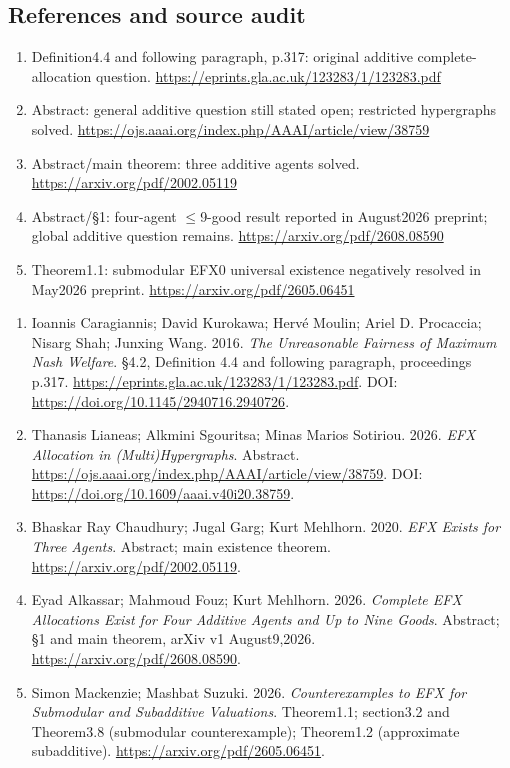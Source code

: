 \documentclass[11pt,a4paper]{article}
\begin{document}
\subsection*{References and source audit}
\begin{enumerate}
\item Definition4.4 and following paragraph, p.317: original additive complete-allocation question. \url{https://eprints.gla.ac.uk/123283/1/123283.pdf}
\item Abstract: general additive question still stated open; restricted hypergraphs solved. \url{https://ojs.aaai.org/index.php/AAAI/article/view/38759}
\item Abstract/main theorem: three additive agents solved. \url{https://arxiv.org/pdf/2002.05119}
\item Abstract/§1: four-agent \ensuremath{\leq}9-good result reported in August2026 preprint; global additive question remains. \url{https://arxiv.org/pdf/2608.08590}
\item Theorem1.1: submodular EFX0 universal existence negatively resolved in May2026 preprint. \url{https://arxiv.org/pdf/2605.06451}
\end{enumerate}
\begin{enumerate}\raggedright
\item\hypertarget{definitions:source:30007558:1}{} Ioannis Caragiannis; David Kurokawa; Hervé Moulin; Ariel D. Procaccia; Nisarg Shah; Junxing Wang. 2016. \emph{The Unreasonable Fairness of Maximum Nash Welfare}. §4.2, Definition 4.4 and following paragraph, proceedings p.317.
\url{https://eprints.gla.ac.uk/123283/1/123283.pdf}.
DOI: \url{https://doi.org/10.1145/2940716.2940726}.
\item\hypertarget{definitions:source:30007558:2}{} Thanasis Lianeas; Alkmini Sgouritsa; Minas Marios Sotiriou. 2026. \emph{EFX Allocation in (Multi)Hypergraphs}. Abstract.
\url{https://ojs.aaai.org/index.php/AAAI/article/view/38759}.
DOI: \url{https://doi.org/10.1609/aaai.v40i20.38759}.
\item\hypertarget{definitions:source:30007558:3}{} Bhaskar Ray Chaudhury; Jugal Garg; Kurt Mehlhorn. 2020. \emph{EFX Exists for Three Agents}. Abstract; main existence theorem.
\url{https://arxiv.org/pdf/2002.05119}.
\item\hypertarget{definitions:source:30007558:4}{} Eyad Alkassar; Mahmoud Fouz; Kurt Mehlhorn. 2026. \emph{Complete EFX Allocations Exist for Four Additive Agents and Up to Nine Goods}. Abstract; §1 and main theorem, arXiv v1 August9,2026.
\url{https://arxiv.org/pdf/2608.08590}.
\item\hypertarget{definitions:source:30007558:5}{} Simon Mackenzie; Mashbat Suzuki. 2026. \emph{Counterexamples to EFX for Submodular and Subadditive Valuations}. Theorem1.1; section3.2 and Theorem3.8 (submodular counterexample); Theorem1.2 (approximate subadditive).
\url{https://arxiv.org/pdf/2605.06451}.
\end{enumerate}
\end{document}
